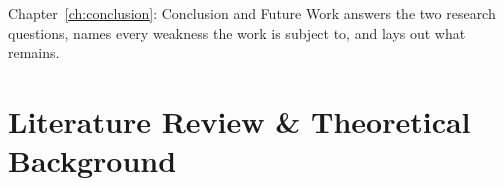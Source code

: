 \documentclass[a4paper,12pt]{report}
\begin{document}
Chapter~\ref{ch:conclusion}: Conclusion and Future Work answers the two
research questions, names every weakness the work is subject to, and lays out what
remains.
%
%
%
%
\chapter{Literature Review \& Theoretical Background}
\label{ch:background}
\end{document}
